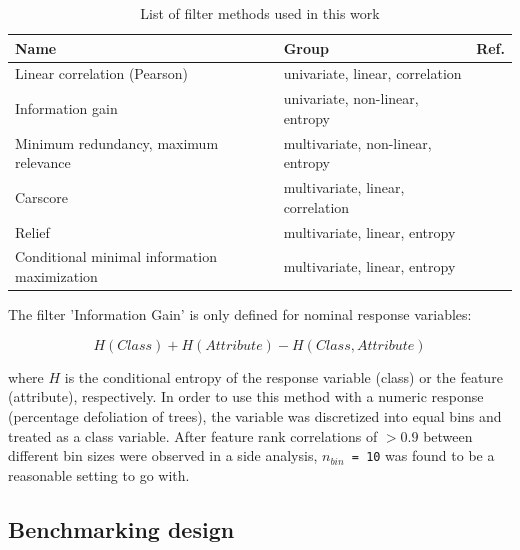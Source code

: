 \documentclass[letterpaper, peerreview, draftcls]{IEEEtran}
\begin{document}
\begin{table}[b!]
	\centering
	\caption{List of filter methods used in this work}
	\label{tab:filter-methods}
	\begingroup\footnotesize
	\begin{adjustbox}{width={0.48\textwidth},totalheight={\textheight},keepaspectratio}
		\begin{tabular}{lll}
			\\
			Name                                         & Group                             & Ref.               \\
			\toprule
			Linear correlation (Pearson)                 & univariate, linear, correlation   & \cite{pearson1901} \\
			Information gain                             & univariate, non-linear, entropy   & \cite{quinlan1986} \\
			Minimum redundancy, maximum relevance        & multivariate, non-linear, entropy & \cite{zhao2013}    \\
			Carscore                                     & multivariate, linear, correlation & \cite{zuber2011}   \\
			Relief                                       & multivariate, linear, entropy     & \cite{kira1992}    \\
			Conditional minimal information maximization & multivariate, linear, entropy     & \cite{fleuret2004}
		\end{tabular}
	\end{adjustbox}
	\endgroup
\end{table}

The filter 'Information Gain' is only defined for nominal response variables:

\begin{equation}
	H(Class) + H(Attribute) - H(Class, Attribute)
\end{equation}

where \(H\) is the conditional entropy of the response variable (class) or the feature (attribute), respectively.
In order to use this method with a numeric response (percentage defoliation of trees), the variable was discretized into equal bins and treated as a class variable.
After feature rank correlations of $> 0.9$ between different bin sizes were observed in a side analysis, \texttt{\(n_{bin}\) = 10} was found to be a reasonable setting to go with.

\subsection{Benchmarking design}
\end{document}
